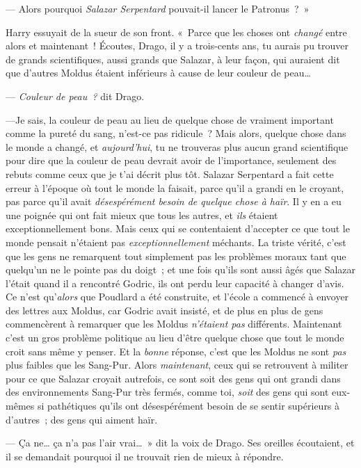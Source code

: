 --- Alors pourquoi \emph{Salazar Serpentard} pouvait-il lancer le Patronus~?~»

Harry essuyait de la sueur de son front.
«~Parce que les choses ont \emph{changé} entre alors et maintenant~!
Écoutes, Drago, il y a trois-cents ans, tu aurais pu trouver de grands scientifiques, aussi grands que Salazar, à leur façon, qui auraient dit que d'autres Moldus étaient inférieurs à cause de leur couleur de peau…

--- \emph{Couleur de peau~?} dit Drago.

---Je sais, la couleur de peau au lieu de quelque chose de vraiment important comme la pureté du sang, n'est-ce pas ridicule~?
Mais alors, quelque chose dans le monde a changé, et \emph{aujourd'hui}, tu ne trouveras plus aucun grand scientifique pour dire que la couleur de peau devrait avoir de l'importance, seulement des rebuts comme ceux que je t'ai décrit plus tôt.
Salazar Serpentard a fait cette erreur à l'époque où tout le monde la faisait, parce qu'il a grandi en le croyant, pas parce qu'il avait \emph{désespérément besoin de quelque chose à haïr}.
Il y en a eu une poignée qui ont fait mieux que tous les autres, et \emph{ils} étaient exceptionnellement bons.
Mais ceux qui se contentaient d'accepter ce que tout le monde pensait n'étaient pas \emph{exceptionnellement} méchants.
La triste vérité, c'est que les gens ne remarquent tout simplement pas les problèmes moraux tant que quelqu'un ne le pointe pas du doigt~; et une fois qu'ils sont aussi âgés que Salazar l'était quand il a rencontré Godric, ils ont perdu leur capacité à changer d'avis.
Ce n'est qu'\emph{alors} que Poudlard a été construite, et l'école a commencé à envoyer des lettres aux Moldus, car Godric avait insisté, et de plus en plus de gens commencèrent à remarquer que les Moldus \emph{n'étaient pas} différents.
Maintenant c'est un gros problème politique au lieu d'être quelque chose que tout le monde croit sans même y penser.
Et la \emph{bonne} réponse, c'est que les Moldus ne sont \emph{pas} plus faibles que les Sang-Pur.
Alors \emph{maintenant}, ceux qui se retrouvent à militer pour ce que Salazar croyait autrefois, ce sont soit des gens qui ont grandi dans des environnements Sang-Pur très fermés, comme toi, \emph{soit} des gens qui sont eux-mêmes si pathétiques qu'ils ont désespérément besoin de se sentir supérieurs à d'autres~; des gens qui aiment haïr.

--- Ça ne… ça n'a pas l'air vrai…~»
dit la voix de Drago.
Ses oreilles écoutaient, et il se demandait pourquoi il ne trouvait rien de mieux à répondre.

